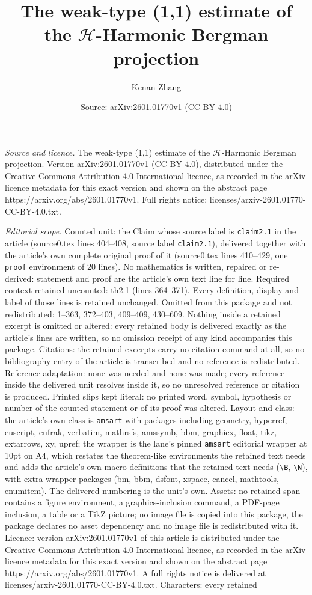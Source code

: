 \documentclass[10pt,a4paper]{amsart}
\title[The weak-type (1,1) estimate of the $\mathcal{H}$-Harmonic B]{The weak-type (1,1) estimate of the $\mathcal{H}$-Harmonic Bergman projection}
\author{Kenan Zhang}
\date{Source: arXiv:2601.01770v1 (CC BY 4.0)}
\begin{document}
\maketitle

\noindent\emph{Source and licence.} The weak-type (1,1) estimate of the $\mathcal{H}$-Harmonic Bergman projection. Version arXiv:2601.01770v1 (CC BY 4.0), distributed under the Creative Commons Attribution 4.0 International licence, as recorded in the arXiv licence metadata for this exact version and shown on the abstract page https://arxiv.org/abs/2601.01770v1. Full rights notice: licenses/arxiv-2601.01770-CC-BY-4.0.txt.\par\smallskip

\noindent\textit{Editorial scope.} Counted unit: the Claim whose source label is \texttt{claim2.1} in the article (source0.tex lines 404--408, source label \texttt{claim2.1}), delivered together with the article's own complete original proof of it (source0.tex lines 410--429, one \texttt{proof} environment of 20 lines). No mathematics is written, repaired or re-derived: statement and proof are the article's own text line for line. Required context retained uncounted: th2.1 (lines 364--371). Every definition, display and label of those lines is retained unchanged. Omitted from this package and not redistributed: 1--363, 372--403, 409--409, 430--609. Nothing inside a retained excerpt is omitted or altered: every retained body is delivered exactly as the article's lines are written, so no omission receipt of any kind accompanies this package. Citations: the retained excerpts carry no citation command at all, so no bibliography entry of the article is transcribed and no reference is redistributed. Reference adaptation: none was needed and none was made; every reference inside the delivered unit resolves inside it, so no unresolved reference or citation is produced. Printed slips kept literal: no printed word, symbol, hypothesis or number of the counted statement or of its proof was altered. Layout and class: the article's own class is \texttt{amsart} with packages including geometry, hyperref, euscript, eufrak, verbatim, mathrsfs, amssymb, bbm, graphicx, float, tikz, extarrows, xy, upref; the wrapper is the lane's pinned \texttt{amsart} editorial wrapper at 10pt on A4, which restates the theorem-like environments the retained text needs and adds the article's own macro definitions that the retained text needs (\texttt{\textbackslash B}, \texttt{\textbackslash N}), with extra wrapper packages (bm, bbm, dsfont, xspace, cancel, mathtools, enumitem). The delivered numbering is the unit's own. Assets: no retained span contains a figure environment, a graphics-inclusion command, a PDF-page inclusion, a table or a TikZ picture; no image file is copied into this package, the package declares no asset dependency and no image file is redistributed with it. Licence: version arXiv:2601.01770v1 of this article is distributed under the Creative Commons Attribution 4.0 International licence, as recorded in the arXiv licence metadata for this exact version and shown on the abstract page https://arxiv.org/abs/2601.01770v1. A full rights notice is delivered at licenses/arxiv-2601.01770-CC-BY-4.0.txt. Characters: every retained 
\end{document}
